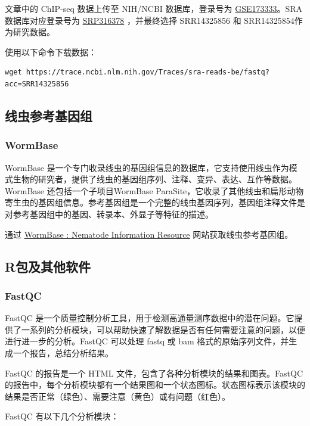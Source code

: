 \documentclass[UTF8]{ctexart}
\begin{document}
文章中的 ChIP-seq 数据上传至 NIH/NCBI 数据库，登录号为 \href{https://www.ncbi.nlm.nih.gov/geo/query/acc.cgi?acc=GSE173333}{GSE173333}。SRA 数据库对应登录号为 \href{https://www.ncbi.nlm.nih.gov/sra?term=SRP316378}{SRP316378} ，并最终选择 SRR14325856 和 SRR14325854作为研究数据。

使用以下命令下载数据：

\begin{lstlisting}
wget https://trace.ncbi.nlm.nih.gov/Traces/sra-reads-be/fastq?acc=SRR14325856
\end{lstlisting}

\subsection{线虫参考基因组}

\subsubsection{WormBase}

WormBase 是一个专门收录线虫的基因组信息的数据库，它支持使用线虫作为模式生物的研究者，提供了线虫的基因组序列、注释、变异、表达、互作等数据。WormBase 还包括一个子项目WormBase ParaSite，它收录了其他线虫和扁形动物寄生虫的基因组信息。参考基因组是一个完整的线虫基因序列，基因组注释文件是对参考基因组中的基因、转录本、外显子等特征的描述。

通过 \href{https://wormbase.org/}{WormBase : Nematode Information Resource} 网站获取线虫参考基因组。

\subsection{R包及其他软件}

\subsubsection{FastQC}

FastQC 是一个质量控制分析工具，用于检测高通量测序数据中的潜在问题。它提供了一系列的分析模块，可以帮助快速了解数据是否有任何需要注意的问题，以便进行进一步的分析。FastQC 可以处理 fastq 或 bam 格式的原始序列文件，并生成一个报告，总结分析结果。

FastQC 的报告是一个 HTML 文件，包含了各种分析模块的结果和图表。FastQC 的报告中，每个分析模块都有一个结果图和一个状态图标。状态图标表示该模块的结果是否正常（绿色）、需要注意（黄色）或有问题（红色）。

FastQC 有以下几个分析模块：
\end{document}
